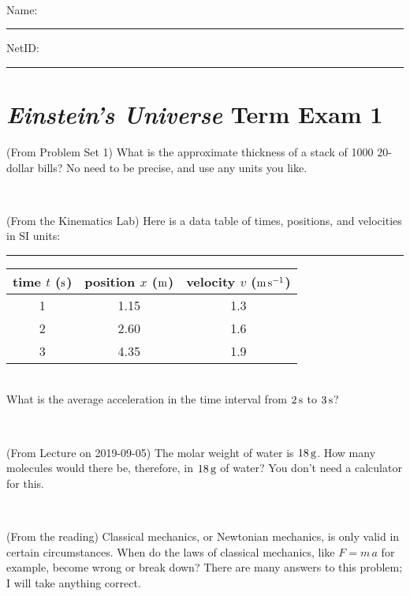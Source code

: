 \documentclass[12pt, letterpaper]{article}
\begin{document}
\vfill ~


\cleardoublepage



\noindent
Name: \rule[-1ex]{0.60\textwidth}{0.1pt}
NetID: \rule[-1ex]{0.20\textwidth}{0.1pt}

\section*{\textsl{Einstein's Universe} Term Exam 1}
\setcounter{problem}{1}


\begin{problem} (From Problem Set 1)
What is the approximate thickness of a stack of 1000 20-dollar bills?
No need to be precise, and use any units you like.
\end{problem}


\vfill ~

\begin{problem} (From the Kinematics Lab)
Here is a data table of times, positions, and velocities in SI units:\\
\rule{1.0in}{0pt}\begin{tabular}{c|c|c}
time $t$ ($\mathrm{s}$) & position $x$ ($\mathrm{m}$) & velocity $v$ ($\mathrm{m}\,\mathrm{s}^{-1}$) \\
\hline
1 & 1.15 & 1.3 \\
2 & 2.60 & 1.6 \\
3 & 4.35 & 1.9 \\
\hline
\end{tabular}\\
What is the average acceleration in the time interval from $2\,\mathrm{s}$ to $3\,\mathrm{s}$?
\end{problem}


\vfill ~

\begin{problem} (From Lecture on 2019-09-05)
The molar weight of water is $18\,\mathrm{g}$. How many molecules would there
be, therefore, in $18\,\mathrm{g}$ of water? You don't need a calculator for
this.
\end{problem}


\vfill ~

\begin{problem} (From the reading)
Classical mechanics, or Newtonian mechanics, is only valid in certain
circumstances. When do the laws of classical mechanics, like $F =
m\,a$ for example, become wrong or break down? There are many answers
to this problem; I will take anything correct.
\end{problem}
\end{document}
